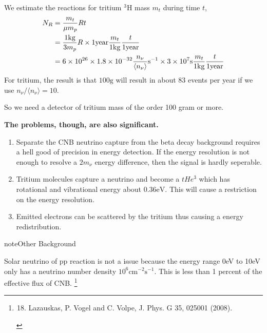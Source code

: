 \documentclass[letterpaper,12pt,english]{sphinxmanual}
\begin{document}
We estimate the reactions for tritium \(\mathrm{{}^3H}\) mass \(m_t\) during time \(t\),
\begin{gather}
\begin{split}N_R &= \frac{m_t}{\mu m_p} R t \\
& = \frac{1\mathrm{kg}}{3 m_p} R \times 1\mathrm{year} \frac{m_t}{1\mathrm{kg}} \frac{t}{1\mathrm{year}}\\
& = 6\times 10^{26} \times 1.8 \times 10^{-32} \frac{n_\nu}{\langle n_\nu \rangle} \mathrm{s}^{-1} \times 3\times 10^7 \mathrm{s} \frac{m_t}{1\mathrm{kg}} \frac{t}{1\mathrm{year}}\end{split}\notag
\end{gather}
For tritium, the result is that \(100\mathrm{g}\) will result in about 83 events per year if we use \(n_\nu/\langle n_\nu \rangle =10\).

So we need a detector of tritium mass of the order 100 gram or more.

\textbf{The problems, though, are also significant.}
\begin{enumerate}
\item {} 
Separate the CNB neutrino capture from the beta decay background requires a hell good of precision in energy detection. If the energy resolution is not enough to resolve a \(2m_\nu\) energy difference, then the signal is hardly seperable.

\item {} 
Tritium molecules capture a neutrino and become a \(t He^3\) which has rotational and vibrational energy about \(0.36\mathrm{eV}\). This will cause a restriction on the energy resolution.

\item {} 
Emitted electrons can be scattered by the tritium thus causing a energy redistribution.

\end{enumerate}

\begin{notice}{note}{Other Background}

Solar neutrino of pp reaction is not a issue because the energy range 0eV to 10eV only has a neutrino number density \(10^6\mathrm{cm}^{-2} \mathrm{s}^{-1}\). This is less than 1 percent of the effective flux of CNB. \footnote{\begin{enumerate}
\setcounter{enumi}{17}
\item {} 
Lazauskas, P. Vogel and C. Volpe, J. Phys. G 35, 025001 (2008).

\end{enumerate}
}
\end{notice}
\end{document}
